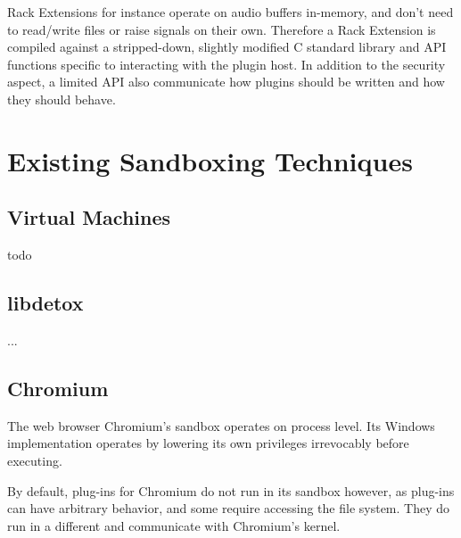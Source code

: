 Rack Extensions for instance operate on audio buffers in-memory, and don't need
to read/write files or raise signals on their own. Therefore a Rack Extension is
compiled against a stripped-down, slightly modified C standard library and API
functions specific to interacting with the plugin host. In addition to the
security aspect, a limited API also communicate how plugins should be written
and how they should behave.


\section {Existing Sandboxing Techniques}

\subsection {Virtual Machines}

todo

\subsection {libdetox}

...

\subsection {Chromium}

The web browser Chromium's sandbox operates on process level. Its Windows
implementation operates by lowering its own privileges irrevocably before
executing.

By default, plug-ins for Chromium do not run in its sandbox however, as
plug-ins can have arbitrary behavior, and some require accessing the file
system. They do run in a different and communicate with Chromium's kernel.

